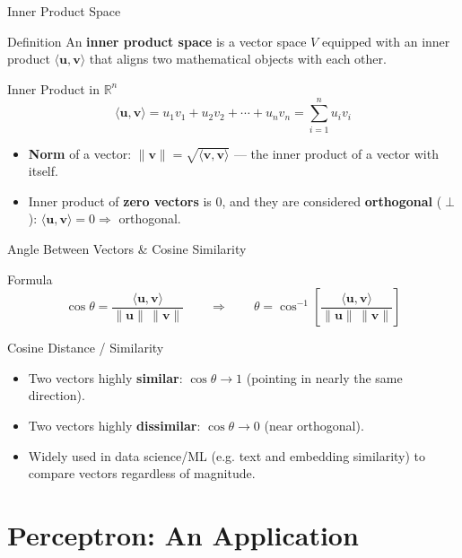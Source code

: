 \documentclass[9pt,aspectratio=169]{beamer}
\newcommand{\R}{\mathbb{R}}
\newcommand{\vect}[1]{\mathbf{#1}}
\begin{document}
\begin{frame}{Inner Product Space}
\begin{block}{Definition}
An \textbf{inner product space} is a vector space $V$ equipped with an inner product $\langle \vect{u},\vect{v}\rangle$ that aligns two mathematical objects with each other.
\end{block}
\begin{block}{Inner Product in $\R^n$}
$$\langle \vect{u},\vect{v}\rangle = u_1v_1+u_2v_2+\cdots+u_nv_n = \sum_{i=1}^n u_iv_i$$
\end{block}
\begin{itemize}
\item \textbf{Norm} of a vector: $\|\vect{v}\| = \sqrt{\langle \vect{v},\vect{v}\rangle}$ — the inner product of a vector with itself.
\item Inner product of \textbf{zero vectors} is $0$, and they are considered \textbf{orthogonal} ($\perp$): $\langle\vect{u},\vect{v}\rangle = 0 \Rightarrow$ orthogonal.
\end{itemize}
\end{frame}

\begin{frame}{Angle Between Vectors \& Cosine Similarity}
\begin{block}{Formula}
$$\cos\theta = \frac{\langle \vect{u},\vect{v}\rangle}{\|\vect{u}\|\,\|\vect{v}\|} \qquad \Longrightarrow \qquad \theta = \cos^{-1}\!\left[\frac{\langle \vect{u},\vect{v}\rangle}{\|\vect{u}\|\,\|\vect{v}\|}\right]$$
\end{block}
\begin{alertblock}{Cosine Distance / Similarity}
\begin{itemize}
\item Two vectors highly \textbf{similar}: $\cos\theta \to 1$ (pointing in nearly the same direction).
\item Two vectors highly \textbf{dissimilar}: $\cos\theta \to 0$ (near orthogonal).
\end{itemize}
\end{alertblock}
\begin{itemize}
\item Widely used in data science/ML (e.g. text and embedding similarity) to compare vectors regardless of magnitude.
\end{itemize}
\end{frame}

\section{Perceptron: An Application}
\end{document}
